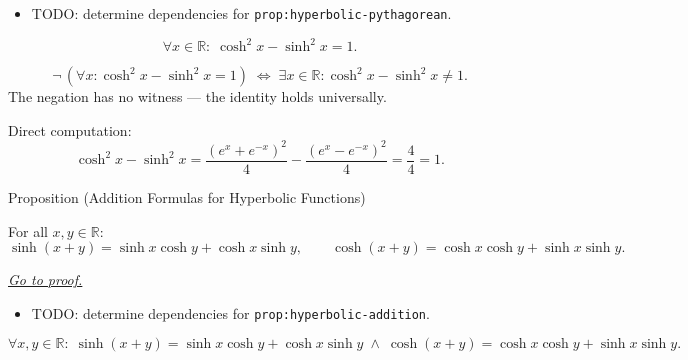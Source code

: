 \begin{dependencies}
\begin{itemize}
  \item TODO: determine dependencies for \texttt{prop:hyperbolic-pythagorean}.
\end{itemize}
\end{dependencies}

\begin{remark*}
\[
  \forall x \in \mathbb{R} :\; \cosh^2 x - \sinh^2 x = 1.
\]
\end{remark*}

\begin{remark*}
\[
  \neg\,(\forall x:\cosh^2 x - \sinh^2 x=1)
  \;\iff\;
  \exists x\in\mathbb{R}:\cosh^2 x - \sinh^2 x\neq 1.
\]
The negation has no witness --- the identity holds universally.
\end{remark*}

\begin{remark*}[Proof]
Direct computation:
\[
  \cosh^2 x - \sinh^2 x
  = \frac{(e^x+e^{-x})^2}{4} - \frac{(e^x-e^{-x})^2}{4}
  = \frac{4}{4} = 1.
\]
\end{remark*}


\begin{propositionbox}{Proposition (Addition Formulas for Hyperbolic Functions)}
\begin{proposition}
\label{prop:hyperbolic-addition}
For all $x, y \in \mathbb{R}$:
\[
  \sinh(x+y) = \sinh x \cosh y + \cosh x \sinh y,
  \qquad
  \cosh(x+y) = \cosh x \cosh y + \sinh x \sinh y.
\]

\smallskip\noindent
\hyperref[prf:hyperbolic-addition]{\textit{Go to proof.}}
\end{proposition}
\end{propositionbox}

\begin{dependencies}
\begin{itemize}
  \item TODO: determine dependencies for \texttt{prop:hyperbolic-addition}.
\end{itemize}
\end{dependencies}

\begin{remark*}
\[
  \forall x,y\in\mathbb{R}:\;
  \sinh(x+y) = \sinh x\cosh y + \cosh x\sinh y
  \;\wedge\;
  \cosh(x+y) = \cosh x\cosh y + \sinh x\sinh y.
\]
\end{remark*}

